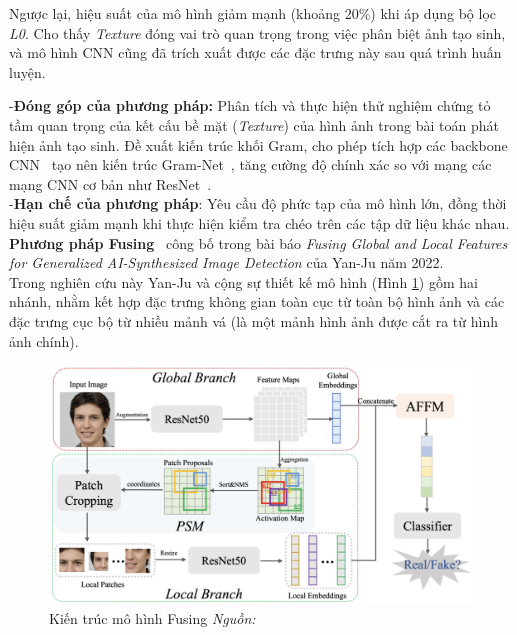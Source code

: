 Ngược lại, hiệu suất của mô hình giảm mạnh (khoảng 20\%) khi áp dụng bộ lọc \textit{L0}. Cho thấy \textit{Texture} đóng vai trò quan trọng trong việc phân biệt ảnh tạo sinh, và mô hình CNN cũng đã trích xuất được các đặc trưng này sau quá trình huấn luyện.

%
%
-\textbf{Đóng góp của phương pháp:}
Phân tích và thực hiện thử nghiệm chứng tỏ tầm quan trọng của kết cấu bề mặt (\textit{Texture}) của hình ảnh trong bài toán phát hiện ảnh tạo sinh.
%
Đề xuất kiến trúc khối Gram, cho phép tích hợp các \gls{backbone} CNN~\cite{Krizhevsky2012ImageNetCW} tạo nên kiến trúc Gram-Net~\cite{9157447}, tăng cường độ chính xác so với mạng các mạng CNN cơ bản như ResNet~\cite{He2015DeepRL}.\\
%
-\textbf{Hạn chế của phương pháp}:
Yêu cầu độ phức tạp của mô hình lớn, đồng thời hiệu suất giảm mạnh khi thực hiện kiểm tra chéo trên các tập dữ liệu khác nhau.\\
%
\textbf{Phương pháp Fusing}~\cite{9897820} công bố trong bài báo \textit{Fusing Global and Local Features for Generalized AI-Synthesized Image Detection} của Yan-Ju năm 2022.\\
Trong nghiên cứu này Yan-Ju và cộng sự thiết kế mô hình (Hình \ref{fig:model-fusing-architecture-1}) gồm hai nhánh, nhằm kết hợp đặc trưng không gian toàn cục từ toàn bộ hình ảnh và các đặc trưng cục bộ từ nhiều mảnh vá (là một mảnh hình ảnh được cắt ra từ hình ảnh chính).
%
\begin{figure}[ht!]
	\centering
	\includegraphics[width=1.0\linewidth]{Images/model-fusing-architecture-1.png}
	\begin{minipage}{0.9\linewidth}
		\caption{Kiến trúc mô hình Fusing \textit{Nguồn: \cite{9897820}}}
		\label{fig:model-fusing-architecture-1}
	\end{minipage}
\end{figure}
%

